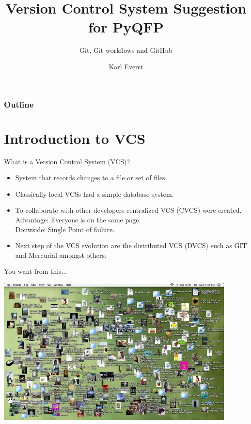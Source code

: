 \documentclass[xcolor=dvipsnames]{beamer}
\title[Version Control Systems for PyQFP]{Version Control System Suggestion for PyQFP}
\subtitle[Karl Everst]{Git, Git workflows and GitHub}
\author[Karl Everst]{Karl Everst}
\begin{document}


\begin{frame}
\titlepage
\end{frame}

\begin{frame}
\frametitle{Outline}
\tableofcontents[]
\end{frame}

\section{Introduction to VCS}

\begin{frame}{What is a Version Control System (VCS)?}

\begin{itemize}

	\item System that records changes to a file or set of files.
	\item Classically local VCSs had a simple database system.
	\item To collaborate with other developers centralized VCS (CVCS) were created.
	\\Advantage: Everyone is on the same page.
	\\Donwside: Single Point of failure.
	\item Next step of the VCS evolution are the distributed VCS (DVCS) such as GIT and
	Mercurial amongst others.

\end{itemize}

\end{frame}

\begin{frame}{You want from this...}

\includegraphics[width = 0.9\textwidth]{messy.jpg}

\end{frame}
\end{document}
